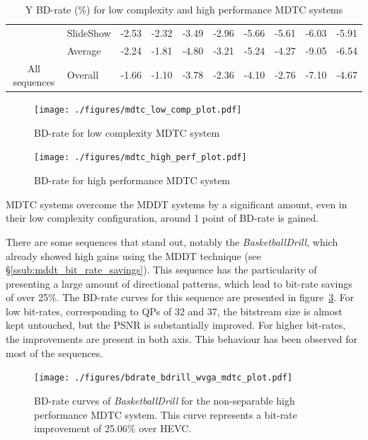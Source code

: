 \documentclass[11pt,a4paper,openright,twoside]{book}
\def\usepdfs{1} %
\numberwithin{equation}{section} %
\numberwithin{figure}{section} %
\numberwithin{table}{section} %
\begin{document}
\begin{table}[tb]
\begin{tabularx}{\textwidth}{c|X|rr|rr|rr|rr}
		& SlideShow              & -2.53 & -2.32 &  -3.49 & -2.96 & -5.66 & -5.61 & -6.03  &  -5.91 \\
		\cline{2-10} &
		Average                  & -2.24 & -1.81 &  -4.80 & -3.21 & -5.24 & -4.27 & -9.05  & -6.54 \\
		\hline
		\hline
		All sequences &
		Overall                  & -1.66 & -1.10 &  -3.78 & -2.36 & -4.10 & -2.76 & -7.10  &  -4.67 \\
	\end{tabularx}
	\caption{Y \acs{BD}-rate (\%) for low complexity and high performance \acs{MDTC} systems}
	\label{tab:bd_rate_mdtc}
\end{table}

\begin{figure}[tb]
	\centering
	\ifthenelse{\usepdfs = 0}
	{}
	{\texttt{[image: ./figures/mdtc\_low\_comp\_plot.pdf]}}
	\caption{\acs{BD}-rate for low complexity \acs{MDTC} system}
	\label{fig:mdtc_low_comp}
\end{figure}

\begin{figure}[tb]
	\centering
	\ifthenelse{\usepdfs = 0}
	{}
	{\texttt{[image: ./figures/mdtc\_high\_perf\_plot.pdf]}}
	\caption{\acs{BD}-rate for high performance \acs{MDTC} system}
	\label{fig:mdtc_high_perf}
\end{figure}

\ac{MDTC} systems overcome the \ac{MDDT} systems by a significant amount,
even in their low complexity configuration, around 1 point of \ac{BD}-rate is
gained.

There are some sequences that stand out, notably the \emph{BasketballDrill},
which already showed high gains using the \ac{MDDT} technique (see
\S\ref{ssub:mddt_bit_rate_savings}).
This sequence has the particularity of presenting a large amount of directional
patterns, which lead to bit-rate savings of over 25\%.
The \ac{BD}-rate curves for this sequence are presented in
figure~\ref{fig:mdtc_bdrate_bdrill_mdtc}.
For low bit-rates, corresponding to \acp{QP} of 32 and 37, the bitstream size
is almost kept untouched, but the \ac{PSNR} is substantially improved.
For higher bit-rates, the improvements are present in both axis.
This behaviour has been observed for most of the sequences.

\begin{figure}[tb]
	\centering
	\ifthenelse{\usepdfs = 0}
	{}
	{\texttt{[image: ./figures/bdrate\_bdrill\_wvga\_mdtc\_plot.pdf]}}
	\caption[\acs{BD}-rate curves for \acs{MDTC} system on
	\emph{BasketballDrill}]
	{\acs{BD}-rate curves of \emph{BasketballDrill} for the non-separable high
	performance \acs{MDTC} system.
	This curve represents a bit-rate improvement of 25.06\% over \acs{HEVC}.}
	\label{fig:mdtc_bdrate_bdrill_mdtc}
\end{figure}
\end{document}
